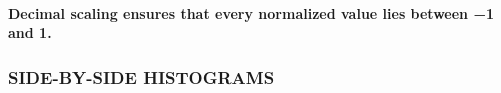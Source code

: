\documentclass[11pt,]{article}
\newenvironment{Shaded}{\begin{snugshade}}{\end{snugshade}}
\newcommand{\CommentTok}[1]{\textcolor[rgb]{0.56,0.35,0.01}{\textit{#1}}}
\newcommand{\DecValTok}[1]{\textcolor[rgb]{0.00,0.00,0.81}{#1}}
\newcommand{\KeywordTok}[1]{\textcolor[rgb]{0.13,0.29,0.53}{\textbf{#1}}}
\newcommand{\NormalTok}[1]{#1}
\newcommand{\OperatorTok}[1]{\textcolor[rgb]{0.81,0.36,0.00}{\textbf{#1}}}
\newcommand{\StringTok}[1]{\textcolor[rgb]{0.31,0.60,0.02}{#1}}
\let\oldparagraph\paragraph
\renewcommand{\paragraph}[1]{\oldparagraph{#1}\mbox{}}
\begin{document}
\begin{Shaded}
\end{Shaded}

\hypertarget{decimal-scaling-ensures-that-every-normalized-value-lies-between-1-and-1.}{%
\paragraph{Decimal scaling ensures that every normalized value lies
between −1 and
1.}\label{decimal-scaling-ensures-that-every-normalized-value-lies-between-1-and-1.}}

\begin{Shaded}
\end{Shaded}

\hypertarget{side-by-side-histograms}{%
\subsubsection{SIDE-BY-SIDE HISTOGRAMS}\label{side-by-side-histograms}}
\end{document}
